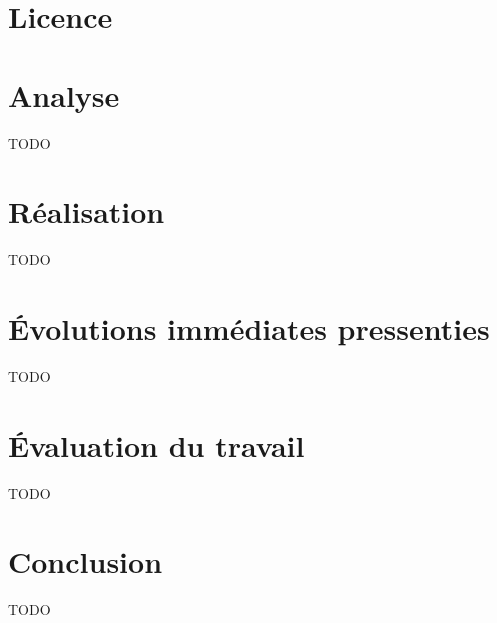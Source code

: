 \documentclass[12pt]{report}
\begin{document}

	\setcounter{page}{1}

	\chapter*{Licence}
	\clearpage

	\renewcommand{\thepage}{\roman{page}}

	\tableofcontents
	\clearpage

	\renewcommand{\thepage}{\arabic{page}}

	

    

	

	\chapter{Analyse}
	\label{ch:analysis}

		TODO

	\chapter{Réalisation}
	\label{ch:implementation}

		TODO

	\chapter{Évolutions immédiates pressenties}
	\label{ch:next-steps}

		TODO

	\chapter{Évaluation du travail}
	\label{ch:auto-critic}

		TODO

	\chapter{Conclusion}
	\label{ch:conclusion}

		TODO
		
	

	\printbibliography

\end{document}
